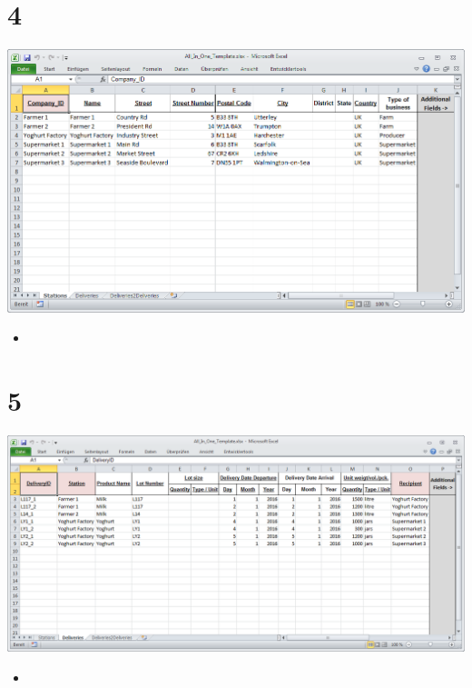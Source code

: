 \documentclass{beamer}
\begin{document}
\section{4}
\begin{frame}
	\begin{center}
  		\includegraphics[height=0.6\textheight]{4.png}
	\end{center}
	\begin{itemize}
		\item
	\end{itemize}
\end{frame}

\section{5}
\begin{frame}
	\begin{center}
  		\includegraphics[height=0.5\textheight]{5.png}
	\end{center}
	\begin{itemize}
		\item
	\end{itemize}
\end{frame}
\end{document}
